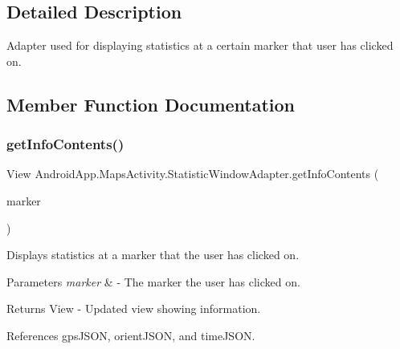 \subsection{Detailed Description}
Adapter used for displaying statistics at a certain marker that user has clicked on. 

\subsection{Member Function Documentation}
\mbox{\label{class_android_app_1_1_maps_activity_1_1_statistic_window_adapter_a19ae40ea5994ac2550ec599e3f20268b}} 
\subsubsection{\texorpdfstring{get\+Info\+Contents()}{getInfoContents()}}
{\footnotesize\ttfamily View Android\+App.\+Maps\+Activity.\+Statistic\+Window\+Adapter.\+get\+Info\+Contents (\begin{DoxyParamCaption}\item[{Marker}]{marker }\end{DoxyParamCaption})\hspace{0.3cm}{\ttfamily [inline]}}



Displays statistics at a marker that the user has clicked on. 


\begin{DoxyParams}{Parameters}
{\em marker} & -\/ The marker the user has clicked on. \\
\hline
\end{DoxyParams}
\begin{DoxyReturn}{Returns}
View -\/ Updated view showing information. 
\end{DoxyReturn}


References gps\+J\+S\+ON, orient\+J\+S\+ON, and time\+J\+S\+ON.



